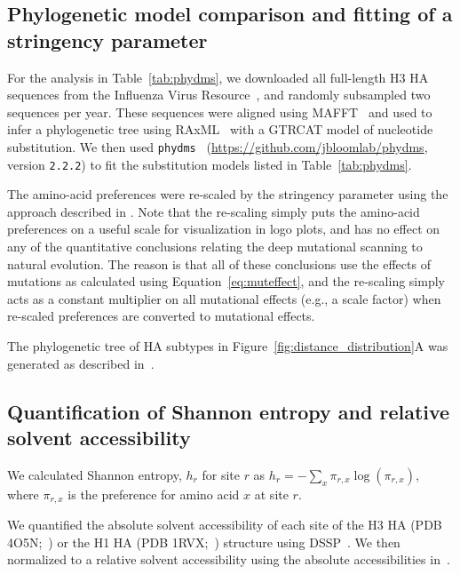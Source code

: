 \documentclass[9pt,twocolumn,twoside]{pnas-new}
\begin{document}
{\subsection*{Phylogenetic model comparison and fitting of a stringency parameter}
For the analysis in Table~\ref{tab:phydms}, we downloaded all full-length H3 HA sequences from the Influenza Virus Resource~\cite{bao2008}, and randomly subsampled two sequences per year.
These sequences were aligned using MAFFT~\cite{katoh2013mafft} and used to infer a phylogenetic tree using RAxML~\cite{stamatakis2006raxml} with a GTRCAT model of nucleotide substitution.
We then used \texttt{phydms}~\cite{hilton2017phydms} (\url{https://github.com/jbloomlab/phydms}, version \texttt{2.2.2}) to fit the substitution models listed in Table~\ref{tab:phydms}.

The amino-acid preferences were re-scaled by the stringency parameter using the approach described in \cite{hilton2017phydms}.
Note that the re-scaling simply puts the amino-acid preferences on a useful scale for visualization in logo plots, and has no effect on any of the quantitative conclusions relating the deep mutational scanning to natural evolution.
The reason is that all of these conclusions use the effects of mutations as calculated using Equation~\ref{eq:muteffect}, and the re-scaling simply acts as a constant multiplier on all mutational effects (e.g., a scale factor) when re-scaled preferences are converted to mutational effects.

The phylogenetic tree of HA subtypes in Figure~\ref{fig:distance_distribution}A was generated as described in~\cite{doud2018quantifying}.

\subsection*{Quantification of Shannon entropy and relative solvent accessibility}
We calculated Shannon entropy, $h_r$ for site $r$ as $h_r = - \sum_{x} \pi_{r,x} \log(\pi_{r,x})$, where $\pi_{r,x}$ is the preference for amino acid $x$ at site $r$.

We quantified the absolute solvent accessibility of each site of the H3 HA (PDB 4O5N;~\cite{lee2014receptor}) or the H1 HA (PDB 1RVX;~\cite{gamblin2004structure}) structure using DSSP~\cite{kabsch1983}.
We then normalized to a relative solvent accessibility using the absolute accessibilities in~\cite{tien2013}.

}
\end{document}
